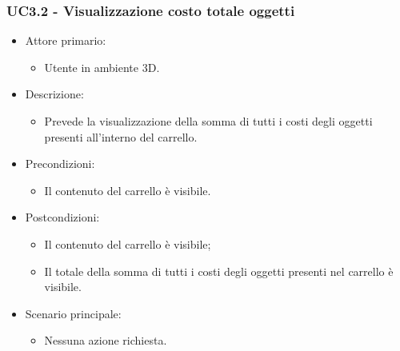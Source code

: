\subsubsection{UC3.2 - Visualizzazione costo totale oggetti}
\begin{itemize}
	
	\item Attore primario: 
	\begin{itemize}
		\item Utente in ambiente 3D.
	\end{itemize}
	\item Descrizione:
	\begin{itemize}
		\item Prevede la visualizzazione della somma di tutti i costi degli oggetti presenti all'interno del carrello.
	\end{itemize}
	
	\item Precondizioni:
	\begin{itemize}
		\item Il contenuto del carrello è visibile.
	\end{itemize}
	
	\item Postcondizioni:
	\begin{itemize}
		\item Il contenuto del carrello è visibile;
		\item Il totale della somma di tutti i costi degli oggetti presenti nel carrello è visibile.
	\end{itemize}
	
	\item Scenario principale:
	\begin{itemize}
		\item Nessuna azione richiesta.
	\end{itemize}
	
\end{itemize}

\pagebreak

